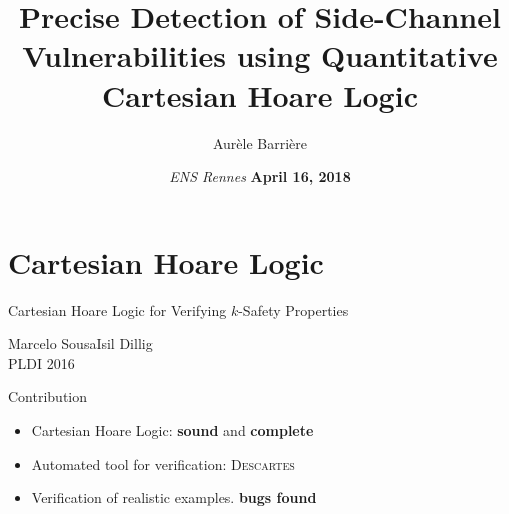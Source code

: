 \documentclass[page number]{beamer}
\def\outline{
  \begin{frame}[plain,noframenumbering]
    \frametitle{Outline}
    \tableofcontents[currentsection]
  \end{frame}
}
\begin{document}
\title[QCHL]{Precise Detection of Side-Channel Vulnerabilities using Quantitative Cartesian Hoare Logic}

\author[Aur\`ele Barri\`ere]{Aur\`ele Barri\`ere}

\date{\textit{ENS Rennes}
  \vfill
  \textbf{April 16, 2018}}

\def\outline{
  \begin{frame}[plain,noframenumbering]
    \frametitle{Outline}
    \tableofcontents[currentsection]
  \end{frame}
}

\begin{frame}
  \vspace{-2cm}
  \maketitle
  \vspace{-4cm}
\end{frame}



\def\spec#1{{\color{spec}\textbf{#1}}}
\def\prog#1{{\color{prog}\textbf{#1}}}

\section{Cartesian Hoare Logic}
\begin{frame}{Cartesian Hoare Logic for Verifying $k$-Safety Properties}
  \begin{center}
    Marcelo Sousa\qquad Isil Dillig\\
    PLDI 2016
  \end{center}
  \vfill
  \begin{exampleblock}{Contribution}
    \begin{itemize}
    \item Cartesian Hoare Logic: \textbf{sound} and \textbf{complete}
    \item Automated tool for verification: \textsc{Descartes}
    \item Verification of realistic examples. \textbf{bugs found}
    \end{itemize}
  \end{exampleblock}
\end{frame}
\end{document}
